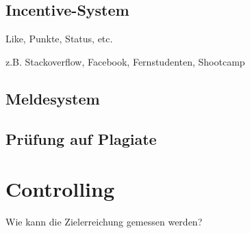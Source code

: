 \subsection{Incentive-System} %
\label{sub:incentive_system}
Like, Punkte, Status, etc.

z.B. Stackoverflow, Facebook, Fernstudenten, Shootcamp

\subsection{Meldesystem} %
\label{sub:meldesystem}


\subsection{Prüfung auf Plagiate} %
\label{sub:prufung_auf_plagiate}



\section{Controlling} %
\label{sec:controlling}
Wie kann die Zielerreichung gemessen werden?
